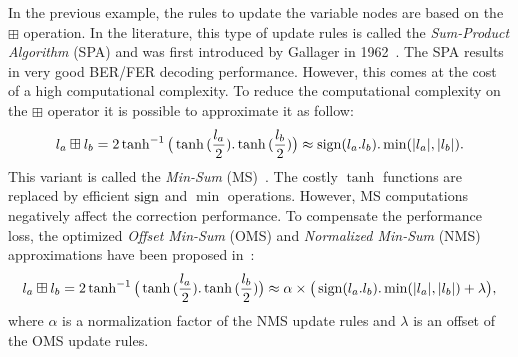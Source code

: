 In the previous example, the rules to update the variable nodes are based on the
$\boxplus$ operation. In the literature, this type of update rules is called the
\emph{Sum-Product Algorithm} (SPA) and was first introduced by Gallager in
1962~\cite{Gallager1962}. The SPA results in very good BER/FER decoding
performance. However, this comes at the cost of a high computational complexity.
To reduce the computational complexity on the $\boxplus$ operator it is possible
to approximate it as follow:
\begin{equation}
\label{eq:ctx_ldpc_ms}
l_a \boxplus l_b = 2\tanh^{-1}{\big(\tanh{(\frac{l_a}{2}).\tanh{(\frac{l_b}{2})}}\big)} \approx \operatorname*{sign}(l_a.l_b).\min(|l_a|, |l_b|).
\end{equation}
This variant is called the \emph{Min-Sum} (MS)~\cite{Fossorier1999}.
The costly $\tanh$ functions are replaced by efficient $\operatorname*{sign}$ and $\min$
operations. However, MS computations negatively affect the correction
performance. To compensate the performance loss, the optimized \emph{Offset
Min-Sum} (OMS) and \emph{Normalized Min-Sum} (NMS) approximations have been
proposed in~\cite{Chen2002}:
\begin{equation}
\label{eq:ctx_ldpc_onms}
l_a \boxplus l_b = 2\tanh^{-1}{\big(\tanh{(\frac{l_a}{2}).\tanh{(\frac{l_b}{2})}}\big)} \approx \alpha \times \big( \operatorname*{sign}(l_a.l_b).\min(|l_a|, |l_b|) + \lambda \big),
\end{equation}
where $\alpha$ is a normalization factor of the NMS update rules and $\lambda$
is an offset of the OMS update rules.




